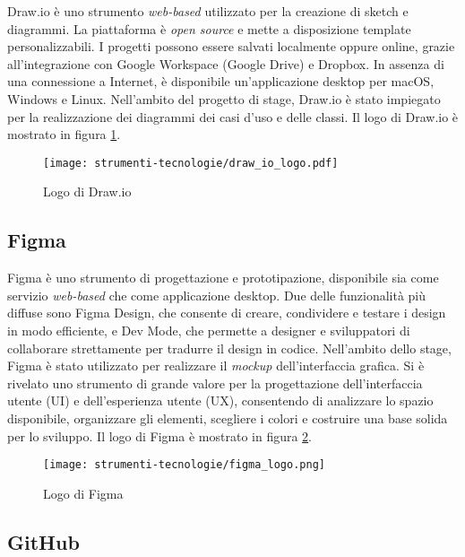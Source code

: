 \par Draw.io è uno strumento \textit{web-based} utilizzato per la creazione di sketch e diagrammi. La piattaforma è \textit{open source} e mette a disposizione template personalizzabili. I progetti possono essere salvati localmente oppure online, grazie all’integrazione con Google Workspace (Google Drive) e Dropbox. In assenza di una connessione a Internet, è disponibile un'applicazione desktop per macOS, Windows e Linux. Nell’ambito del progetto di stage, Draw.io è stato impiegato per la realizzazione dei diagrammi dei casi d’uso e delle classi. Il logo di Draw.io è mostrato in figura \ref{fig:logo_draw_io}.

\begin{figure}[H]
  \centering 
  \texttt{[image: strumenti-tecnologie/draw\_io\_logo.pdf]} 
  \caption{Logo di Draw.io}
  \label{fig:logo_draw_io}
\end{figure}

\subsection*{Figma}

\par Figma è uno strumento di progettazione e prototipazione, disponibile sia come servizio \textit{web-based} che come applicazione desktop. Due delle funzionalità più diffuse sono Figma Design, che consente di creare, condividere e testare i design in modo efficiente, e Dev Mode, che permette a designer e sviluppatori di collaborare strettamente per tradurre il design in codice. Nell’ambito dello stage, Figma è stato utilizzato per realizzare il \textit{mockup} dell’interfaccia grafica. Si è rivelato uno strumento di grande valore per la progettazione dell'interfaccia utente (UI) e dell’esperienza utente (UX), consentendo di analizzare lo spazio disponibile, organizzare gli elementi, scegliere i colori e costruire una base solida per lo sviluppo. Il logo di Figma è mostrato in figura \ref{fig:logo_figma}.

\begin{figure}[H]
  \centering 
  \texttt{[image: strumenti-tecnologie/figma\_logo.png]} 
  \caption{Logo di Figma}
  \label{fig:logo_figma}
\end{figure}

\subsection*{GitHub}

